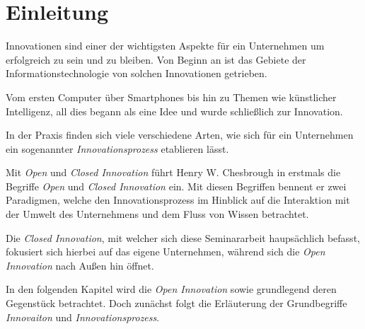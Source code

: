 \section{Einleitung}\label{sec:einleitung}

Innovationen sind einer der wichtigsten Aspekte für ein Unternehmen um erfolgreich zu sein und zu bleiben.
Von Beginn an ist das Gebiete der Informationstechnologie von solchen Innovationen getrieben.

Vom ersten Computer über Smartphones bis hin zu Themen wie künstlicher Intelligenz,
all dies begann als eine Idee und wurde schließlich zur Innovation.

In der Praxis finden sich viele verschiedene Arten,
wie sich für ein Unternehmen ein sogenannter \textit{Innovationsprozess} etablieren lässt.

Mit \textit{Open} und \textit{Closed Innovation} führt Henry W. Chesbrough
in \cite{chesbrough2003} erstmals die Begriffe \textit{Open} und
\textit{Closed Innovation} ein.
Mit diesen Begriffen bennent er zwei Paradigmen, welche den Innovationsprozess im Hinblick auf die
Interaktion mit der Umwelt des Unternehmens und dem Fluss von Wissen betrachtet.

Die \textit{Closed Innovation}, mit welcher sich diese Seminararbeit haupsächlich befasst,
fokusiert sich hierbei auf das eigene Unternehmen, während sich die \textit{Open Innovation}
nach Außen hin öffnet.

In den folgenden Kapitel wird die \textit{Open Innovation} sowie grundlegend deren Gegenstück betrachtet.
Doch zunächst folgt die Erläuterung der Grundbegriffe \textit{Innovaiton} und \textit{Innovationsprozess}.